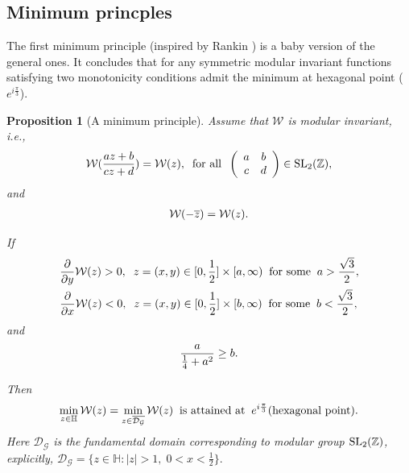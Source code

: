 \documentclass[reqno,english]{amsart}
\newtheorem{proposition}{Proposition}[section]
\newtheorem{open problem}{Open Problem}[section]
\newtheorem{open question}{Open Question}[section]
\newtheorem{open questions on hexagonal lattice}{Open Questions on hexagonal lattice}[section]
\begin{document}
\subsection{Minimum princples}
The first minimum principle (inspired by Rankin \cite{Ran1953}) is a baby version of the general ones. It concludes that for any symmetric modular invariant functions satisfying two monotonicity conditions admit the minimum at hexagonal point ($e^{i\frac{\pi}{3}}$).
\begin{proposition}[A minimum principle]\label{Prop31}  Assume that $\mathcal{W}$ is modular invariant, i.e.,
 \begin{equation}\aligned\label{M999}
\mathcal{W}(\frac{az+b}{cz+d})=\mathcal{W}(z),\;\;\hbox{for all}\;\;\left(
                                                                      \begin{array}{cc}
                                                                        a & b \\
                                                                        c & d \\
                                                                      \end{array}
                                                                    \right)\in \hbox{SL}_2(\mathbb{Z}),
\endaligned\end{equation}
and
 \begin{equation}\aligned\nonumber
\mathcal{W}(-\overline{z})=\mathcal{W}(z).
\endaligned\end{equation}

If \begin{equation}\aligned\label{Cabc1}
&\frac{\partial}{\partial y}\mathcal{W}(z)>0,\;\;z=(x,y)\in[0,\frac{1}{2}]\times[a,\infty)\;\;\hbox{for some}\;\;a>\frac{\sqrt3}{2},\\
&\frac{\partial}{\partial x}\mathcal{W}(z)<0,\;\;z=(x,y)\in[0,\frac{1}{2}]\times[b,\infty)\;\;\hbox{for some}\;\;b<\frac{\sqrt3}{2},
\endaligned\end{equation}
and
 \begin{equation}\aligned\label{fff}
\frac{a}{\frac{1}{4}+a^2}\geq b.
\endaligned\end{equation}

Then
\begin{equation}\aligned\nonumber
\min_{z\in\mathbb{H}}\mathcal{W}(z)=\min_{z\in\overline{\mathcal{D}_{\mathcal{G}}}}\mathcal{W}(z)\;\;\hbox{is attained at}\;\; e^{i\frac{\pi}{3}}(\hbox{hexagonal point}).
\endaligned\end{equation}
Here $\mathcal{D}_{\mathcal{G}}$ is the fundamental domain corresponding to modular group $\hbox{SL}_2(\mathbb{Z})$, explicitly, $\mathcal{D}_{\mathcal{G}}=\{
z\in\mathbb{H}: |z|>1,\; 0<x<\frac{1}{2}
\}.$
\end{proposition}
\end{document}
